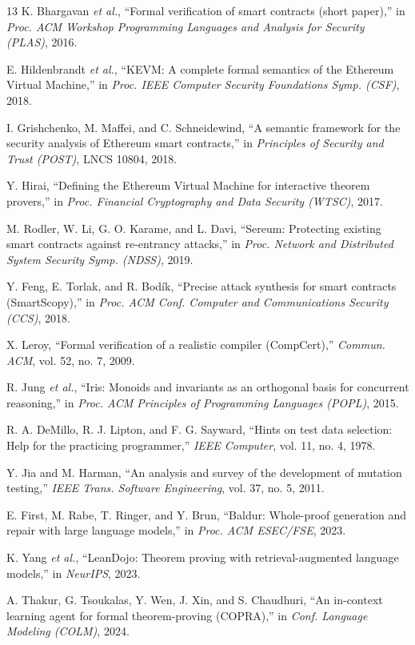 \begin{thebibliography}{13}
K. Bhargavan \emph{et al.}, ``Formal verification of smart contracts (short paper),'' in \emph{Proc. ACM Workshop Programming Languages and Analysis for Security (PLAS)}, 2016.

E. Hildenbrandt \emph{et al.}, ``KEVM: A complete formal semantics of the Ethereum Virtual Machine,'' in \emph{Proc. IEEE Computer Security Foundations Symp. (CSF)}, 2018.

I. Grishchenko, M. Maffei, and C. Schneidewind, ``A semantic framework for the security analysis of Ethereum smart contracts,'' in \emph{Principles of Security and Trust (POST)}, LNCS 10804, 2018.

Y. Hirai, ``Defining the Ethereum Virtual Machine for interactive theorem provers,'' in \emph{Proc. Financial Cryptography and Data Security (WTSC)}, 2017.

M. Rodler, W. Li, G. O. Karame, and L. Davi, ``Sereum: Protecting existing smart contracts against re-entrancy attacks,'' in \emph{Proc. Network and Distributed System Security Symp. (NDSS)}, 2019.

Y. Feng, E. Torlak, and R. Bodík, ``Precise attack synthesis for smart contracts (SmartScopy),'' in \emph{Proc. ACM Conf. Computer and Communications Security (CCS)}, 2018.

X. Leroy, ``Formal verification of a realistic compiler (CompCert),'' \emph{Commun. ACM}, vol. 52, no. 7, 2009.

R. Jung \emph{et al.}, ``Iris: Monoids and invariants as an orthogonal basis for concurrent reasoning,'' in \emph{Proc. ACM Principles of Programming Languages (POPL)}, 2015.

R. A. DeMillo, R. J. Lipton, and F. G. Sayward, ``Hints on test data selection: Help for the practicing programmer,'' \emph{IEEE Computer}, vol. 11, no. 4, 1978.

Y. Jia and M. Harman, ``An analysis and survey of the development of mutation testing,'' \emph{IEEE Trans. Software Engineering}, vol. 37, no. 5, 2011.

E. First, M. Rabe, T. Ringer, and Y. Brun, ``Baldur: Whole-proof generation and repair with large language models,'' in \emph{Proc. ACM ESEC/FSE}, 2023.

K. Yang \emph{et al.}, ``LeanDojo: Theorem proving with retrieval-augmented language models,'' in \emph{NeurIPS}, 2023.

A. Thakur, G. Tsoukalas, Y. Wen, J. Xin, and S. Chaudhuri, ``An in-context learning agent for formal theorem-proving (COPRA),'' in \emph{Conf. Language Modeling (COLM)}, 2024.
\end{thebibliography}
